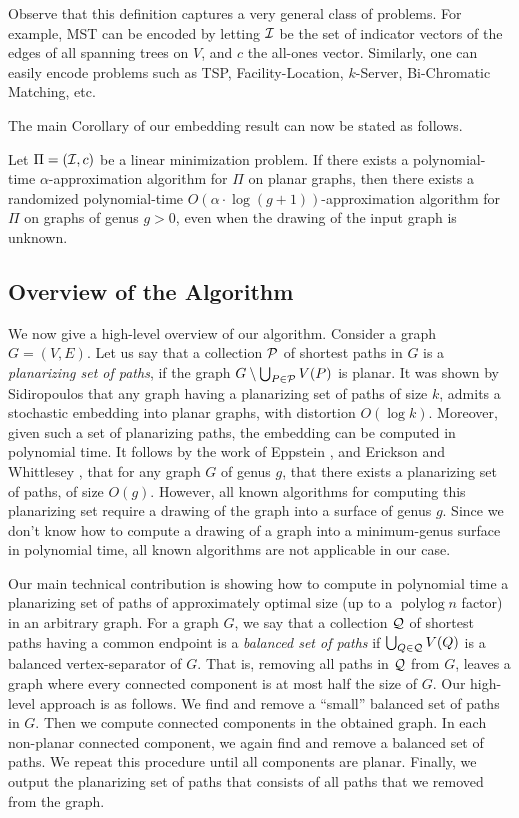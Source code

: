 \documentclass[envcountsect]{llncs}
\begin{document}
Observe that this definition captures a very general class of problems.
For example, MST can be encoded by letting ${\cal I}$ be the set of indicator vectors of the edges of all spanning trees on $V$, and $c$ the all-ones vector.
Similarly, one can easily encode problems such as TSP, Facility-Location, $k$-Server, Bi-Chromatic Matching, etc.

The main Corollary of our embedding result can now be stated as follows.

\begin{corollary}\label{cor:opt}
Let $\Pi=({\cal I}, c)$ be a linear minimization problem.  If there exists a polynomial-time $\alpha$-approximation algorithm for $\Pi$ on planar graphs, then there exists a randomized polynomial-time $O(\alpha\cdot \log (g+1))$-approximation algorithm for $\Pi$ on graphs of genus $g>0$, even when the drawing of the input graph is unknown.
\end{corollary}


\subsection{Overview of the Algorithm}
We now give a high-level overview of our algorithm.
Consider a graph $G=(V,E)$.
Let us say that a collection ${\cal P}$ of shortest paths in $G$ is a \emph{planarizing set of paths}, if the graph $G\setminus \bigcup_{P\in {\cal P}} V(P)$ is planar.
It was shown by Sidiropoulos \cite{sidiropoulos2010optimal} that any graph having a planarizing set of paths of size $k$, admits a stochastic embedding into planar graphs, with distortion $O(\log k)$.
Moreover, given such a set of planarizing paths, the embedding can be computed in polynomial time.
It follows by the work of Eppstein \cite{eppstein2003dynamic}, and Erickson and Whittlesey \cite{erickson2005greedy}, that for any graph $G$ of genus $g$, that there exists a planarizing set of paths, of size $O(g)$.
However, all known algorithms for computing this planarizing set require a drawing of the graph into a surface of genus $g$.
Since we don't know how to compute a drawing of a graph into a minimum-genus surface in polynomial time, all known algorithms are not applicable in our case.

Our main technical contribution is showing how to compute in polynomial time a planarizing set of paths 
of approximately optimal size (up to a $\operatorname{polylog} n$ factor) in an arbitrary graph.
For a graph $G$, we say that a collection ${\cal Q}$ of shortest paths having a common endpoint is a \emph{balanced set of paths} if $\bigcup_{Q\in {\cal Q}} V(Q)$ is a balanced vertex-separator of $G$. That is, removing all paths in ${\cal Q}$ from $G$, leaves a graph where every connected component is at most half the size of $G$.
Our high-level approach is as follows. We find and remove a ``small'' balanced set of paths in $G$. 
Then we compute connected components in the obtained graph.
In each non-planar connected component, we again find and remove a balanced set of paths. We 
repeat this procedure until all components are planar. Finally, we output the planarizing set of paths 
that consists of all paths that we removed from the graph.
\end{document}
